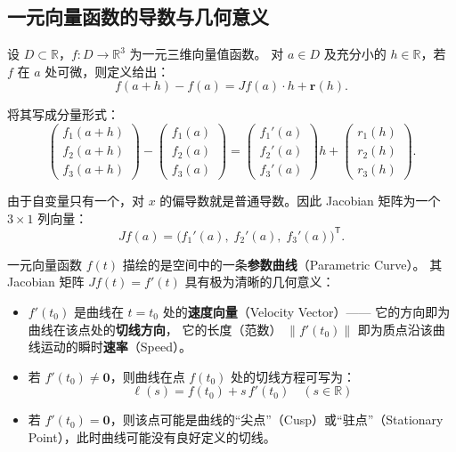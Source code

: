\documentclass[lang=cn,11pt]{elegantbook}
\begin{document}
\subsection{一元向量函数的导数与几何意义}

\begin{exercise} \label{ex:curve-deriv}
设 $D\subset\mathbb R$，$f:D\to\mathbb R^3$ 为一元三维向量值函数。
对 $a\in D$ 及充分小的 $h\in\mathbb R$，若 $f$ 在 $a$ 处可微，则定义给出：
\[
f(a+h)-f(a)=Jf(a)\cdot h+\boldsymbol r(h).
\]

将其写成分量形式：
\[
\begin{pmatrix}
f_1(a+h)\\f_2(a+h)\\f_3(a+h)
\end{pmatrix}
-\begin{pmatrix}
f_1(a)\\f_2(a)\\f_3(a)
\end{pmatrix}
=\begin{pmatrix}
f_1'(a)\\f_2'(a)\\f_3'(a)
\end{pmatrix}h
+\begin{pmatrix}
r_1(h)\\r_2(h)\\r_3(h)
\end{pmatrix}.
\]

由于自变量只有一个，对 $x$ 的偏导数就是普通导数。因此 Jacobian 矩阵为一个 $3\times 1$ 列向量：
\[
\boxed{Jf(a)=\bigl(f_1'(a),\;f_2'(a),\;f_3'(a)\bigr)^{\mathsf T}}.
\]
\end{exercise}

\begin{remark} \label{remark:curve-geometry}
一元向量函数 $f(t)$ 描绘的是空间中的一条\textbf{参数曲线}（Parametric Curve）。
其 Jacobian 矩阵 $Jf(t)=f'(t)$ 具有极为清晰的几何意义：
\begin{itemize}
  \item $f'(t_0)$ 是曲线在 $t=t_0$ 处的\textbf{速度向量}（Velocity Vector）——
        它的方向即为曲线在该点处的\textbf{切线方向}，
        它的长度（范数） $\|f'(t_0)\|$ 即为质点沿该曲线运动的瞬时\textbf{速率}（Speed）。
  \item 若 $f'(t_0) \neq \boldsymbol 0$，则曲线在点 $f(t_0)$ 处的切线方程可写为：
        \[ \boldsymbol \ell(s)=f(t_0)+s\,f'(t_0) \quad (s\in\mathbb R) \]
  \item 若 $f'(t_0)=\boldsymbol 0$，则该点可能是曲线的“尖点”（Cusp）或“驻点”（Stationary Point），此时曲线可能没有良好定义的切线。
\end{itemize}
\end{remark}
\end{document}
